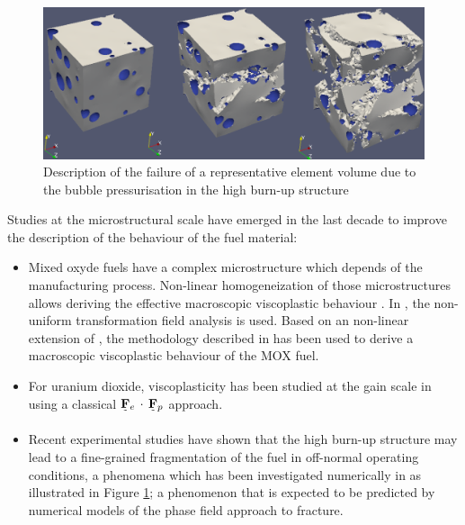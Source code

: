 
\begin{figure}[H]
  \centering
  \includegraphics[width=10.cm]{../chapter_000_introduction/figures/VEREsnoul.png}
  \caption{Description of the failure of a representative element volume due to
  the bubble pressurisation in the high burn-up structure
  \cite{esnoul_etude_2018}}
  \label{fig:hho:esnoul}
\end{figure}

Studies at the microstructural scale have emerged in the last decade to
improve the description of the behaviour of the fuel material:

\begin{itemize}
  \item Mixed oxyde fuels have a complex microstructure which depends of the
  manufacturing process. Non-linear homogeneization of those
  microstructures allows deriving the effective macroscopic viscoplastic
  behaviour \cite{el_abdi_generation_2018}. In
  \cite{roussette_analyse_2005, largenton_modelisation_2012, largenton_extension_2019},
  the non-uniform transformation field analysis is used. Based on an
  non-linear extension of \cite{ricaud_effective_2009}, the methodology
  described in \cite{masson_modified_2020} has been used to derive a
  macroscopic viscoplastic behaviour of the MOX fuel.
  \item For uranium dioxide, viscoplasticity has been
  studied at the gain scale in \cite{portelette_crystal_2018} using a
  classical \({\underset{\tilde{}}{\mathbf{F}}}{}_{e}\,\cdot\,{\underset{\tilde{}}{\mathbf{F}}}{}_{p}\) approach.
  \item Recent experimental studies have shown that the high burn-up structure
  may lead to a fine-grained fragmentation of the fuel in off-normal
  operating conditions, a phenomena which has been investigated
  numerically in \cite{esnoul_etude_2018} as illustrated in Figure
  \ref{fig:hho:esnoul}; a phenomenon that is expected to be predicted by numerical models of the phase field 
  approach to fracture.
\end{itemize}

